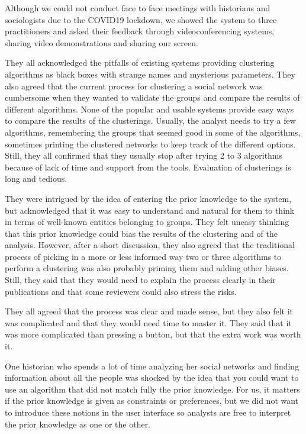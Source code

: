 Although we could not conduct face to face meetings with historians and sociologists due to the COVID19 lockdown, we showed the system to three practitioners and asked their feedback through videoconferencing systems, sharing video demonstrations and sharing our screen.

They all acknowledged the pitfalls of existing systems providing clustering algorithms as black boxes with strange names and mysterious parameters.
They also agreed that the current process for clustering a social network was cumbersome when they wanted to validate the groups and compare the results of different algorithms. None of the popular and usable systems provide easy ways to compare the results of the clusterings. Usually, the analyst needs to try a few algorithms, remembering the groups that seemed good in some of the algorithms, sometimes printing the clustered networks to keep track of the different options. Still, they all confirmed that they usually stop after trying 2 to 3 algorithms because of lack of time and support from the tools. Evaluation of clusterings is long and tedious.

They were intrigued by the idea of entering the prior knowledge to the system, but acknowledged that it was easy to understand and natural for them to think in terms of well-known entities belonging to groups. They felt uneasy thinking that this prior knowledge could bias the results of the clustering and of the analysis. However, after a short discussion, they also agreed that the traditional process of picking in a more or less informed way two or three algorithms to perform a clustering was also probably priming them and adding other biases. Still, they said that they would need to explain the process clearly in their publications and that some reviewers could also stress the risks.

They all agreed that the process was clear and made sense, but they also felt it was complicated and that they would need time to master it. They said that it was more complicated than pressing a button, but that the extra work was worth it.

One historian who spends a lot of time analyzing her social networks and finding information about all the people was shocked by the idea that you could want to use an algorithm that did not match fully the prior knowledge. For us, it matters if the prior knowledge is given as constraints or preferences, but we did not want to introduce these notions in the user interface so analysts are free to interpret the prior knowledge as one or the other.

